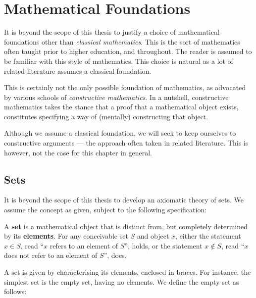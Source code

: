 \section{Mathematical Foundations}

\label{sec:preface:mathematical-foundations}

\def\strue{\ensuremath{\text{\textsc{True}}}}
\def\sfalse{\ensuremath{\text{\textsc{False}}}}

It is beyond the scope of this thesis to justify a choice of mathematical
foundations other than \emph{classical mathematics}. This is the sort of
mathematics often taught prior to higher education, and throughout. The reader
is assumed to be familiar with this style of mathematics. This choice is
natural as a lot of related literature assumes a classical foundation.

This is certainly not the only possible foundation of mathematics, as advocated
by various schools of \emph{constructive mathematics}. In a nutshell,
constructive mathematics takes the stance that a proof that a mathematical
object exists, constitutes specifying a way of (mentally) constructing that
object.

Although we assume a classical foundation, we will seek to keep ourselves to
constructive arguments --- the approach often taken in related literature. This
is however, not the case for this chapter in general.

\subsection{Sets}

It is beyond the scope of this thesis to develop an axiomatic theory of sets.
We assume the concept as given, subject to the following specification:

\begin{specification} \label{spec:set} A \textbf{set} is a mathematical object
that is distinct from, but completely determined by its \textbf{elements}. For
any conceivable set $S$ and object $x$, either the statement $x\in S$, read
``$x$ refers to an element of $S$'', holds, or the statement $x\notin S$, read
``$x$ does not refer to an element of $S$'', does. \end{specification}


A set is given by characterising its elements, enclosed in braces. For
instance, the simplest set is the empty set, having no elements. We define the
empty set as follows:

